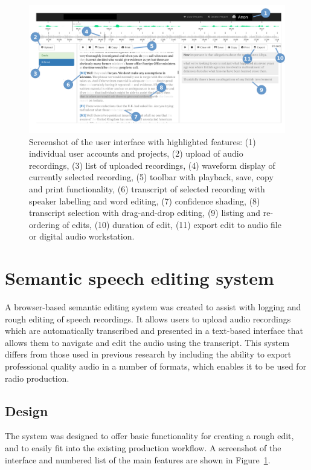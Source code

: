 \begin{figure}
\centering
  \includegraphics[width=\columnwidth]{figs/interface-labels.pdf}
  \caption{Screenshot of the user interface with highlighted features: (1)
    individual user accounts and projects, (2) upload of audio recordings, (3)
    list of uploaded recordings, (4) waveform display of currently selected
    recording, (5) toolbar with playback, save, copy and print functionality,
    (6) transcript of selected recording with speaker labelling and word
    editing, (7) confidence shading, (8) transcript selection with
    drag-and-drop editing, (9) listing and re-ordering of edits, (10) duration
    of edit, (11) export edit to audio file or digital audio workstation.}
  \label{fig:interface}
\end{figure}

\section{Semantic speech editing system}
A browser-based semantic editing system was created to assist with logging and
rough editing of speech recordings. It allows users to upload audio recordings
which are automatically transcribed and presented in a text-based interface
that allows them to navigate and edit the audio using the transcript.
This system differs from those used in previous research by including the
ability to export professional quality audio in a number of formats, which
enables it to be used for radio production.


\subsection{Design}
The system was designed to offer basic functionality for creating a rough edit,
and to easily fit into the existing production workflow. A screenshot of the
interface and numbered list of the main features are shown in
Figure~\ref{fig:interface}.

